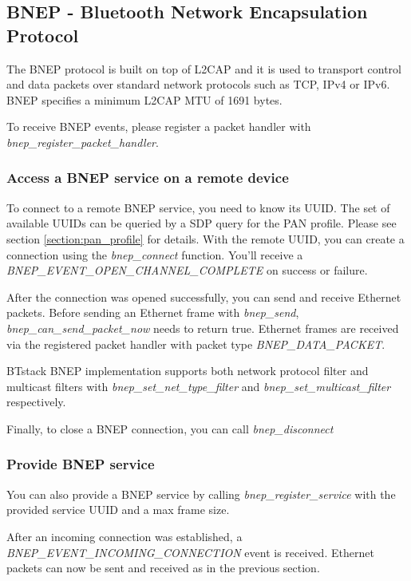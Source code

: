 \subsection{BNEP -  Bluetooth Network Encapsulation Protocol}
The BNEP protocol is built on top of L2CAP and it is used to transport control and data packets over standard network protocols such as TCP, IPv4 or IPv6.  BNEP specifies a minimum L2CAP MTU of 1691 bytes. 

To receive BNEP events, please register a packet handler with \emph{bnep\_register\_packet\_handler}.

\subsubsection{Access a BNEP service on a remote device}
\label{subsubsection:bnepclient}
To connect to a remote BNEP service, you need to know its UUID. The set of available UUIDs can be queried by a SDP query for the PAN profile. Please see section \ref{section:pan_profile} for details. With the remote UUID, you can create a connection using the \emph{bnep\_connect} function. You'll receive a \emph{BNEP\_EVENT\_OPEN\_CHANNEL\_COMPLETE} on success or failure. 

After the connection was opened successfully, you can send and receive Ethernet packets. Before sending an Ethernet frame with \emph{bnep\_send},   \emph{bnep\_can\_send\_packet\_now} needs to return true. Ethernet frames are received via the registered packet handler with packet type \emph{BNEP\_DATA\_PACKET}.

BTstack BNEP implementation supports both network protocol filter and multicast filters with \emph{bnep\_set\_net\_type\_filter} and \emph{bnep\_set\_multicast\_filter} respectively.

Finally, to close a BNEP connection, you can call \emph{bnep\_disconnect}

\subsubsection{Provide BNEP service}
\label{subsubsection:bnepserver}

You can also provide a BNEP service by calling \emph{bnep\_register\_service} with the provided service UUID and a max frame size.

After an incoming connection was established, a \emph{BNEP\_EVENT\_INCOMING\_CONNECTION} event is received. Ethernet packets can now be sent and received as in the previous section.

